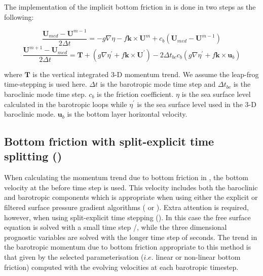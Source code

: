 \documentclass[../tex_main/NEMO_manual]{subfiles}
\begin{document}
The implementation of the implicit bottom friction in  is done in two steps as the
following:

\begin{equation} \label{eq:dynspg_ts_bfr1}
\frac{\textbf{U}_{med}-\textbf{U}^{m-1}}{2\Delta t}=-g\nabla\eta-f\textbf{k}\times\textbf{U}^{m}+c_{b}
\left(\textbf{U}_{med}-\textbf{U}^{m-1}\right)
\end{equation}
\begin{equation} \label{eq:dynspg_ts_bfr2}
\frac{\textbf{U}^{m+1}-\textbf{U}_{med}}{2\Delta t}=\textbf{T}+
\left(g\nabla\eta^{'}+f\textbf{k}\times\textbf{U}^{'}\right)-
2\Delta t_{bc}c_{b}\left(g\nabla\eta^{'}+f\textbf{k}\times\textbf{u}_{b}\right)
\end{equation}

where $\textbf{T}$ is the vertical integrated 3-D momentum trend. We assume the leap-frog time-stepping
is used here. $\Delta t$ is the barotropic mode time step and $\Delta t_{bc}$ is the baroclinic mode time step.
 $c_{b}$ is the friction coefficient. $\eta$ is the sea surface level calculated in the barotropic loops
while $\eta^{'}$ is the sea surface level used in the 3-D baroclinic mode. $\textbf{u}_{b}$ is the bottom
layer horizontal velocity.




\subsection[Bottom friction w/ split-explicit time splitting (\protect\np{ln\_bfrimp})]
				{Bottom friction with split-explicit time splitting (\protect{})}
\label{subsec:ZDF_bfr_ts}

When calculating the momentum trend due to bottom friction in , the
bottom velocity at the before time step is used. This velocity includes both the
baroclinic and barotropic components which is appropriate when using either the
explicit or filtered surface pressure gradient algorithms ( or 
). Extra attention is required, however, when using 
split-explicit time stepping (). In this case the free surface 
equation is solved with a small time step /, while the three 
dimensional prognostic variables are solved with the longer time step 
of  seconds. The trend in the barotropic momentum due to bottom 
friction appropriate to this method is that given by the selected parameterisation 
($i.e.$ linear or non-linear bottom friction) computed with the evolving velocities 
at each barotropic timestep. 
\end{document}
